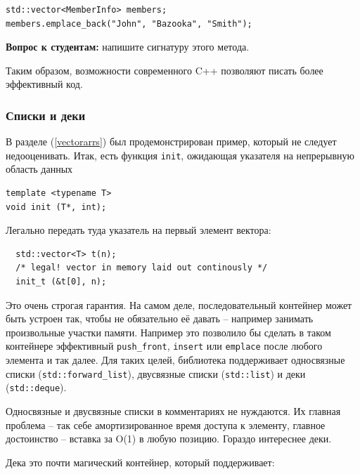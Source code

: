 \documentclass[a4paper,12pt,oneside]{article}
\newif\ifanswers
\begin{document}
\begin{lstlisting}
std::vector<MemberInfo> members;
members.emplace_back("John", "Bazooka", "Smith");
\end{lstlisting}

\textbf{Вопрос к студентам:} напишите сигнатуру этого метода.

\ifanswers
Правильный ответ: 
\begin{lstlisting}
template< class... Args >
void emplace_back( Args&&... args );
\end{lstlisting}
\fi

Таким образом, возможности современного C++ позволяют писать более эффективный код.

\subsubsection{Списки и деки}

В разделе (\ref{vectorarrs}) был продемонстрирован пример, который не следует недооценивать. Итак, есть функция \lstinline!init!, ожидающая указателя на непрерывную область данных

\begin{lstlisting}
template <typename T>
void init (T*, int);
\end{lstlisting}

Легально передать туда указатель на первый элемент вектора:

\begin{lstlisting}
  std::vector<T> t(n);
  /* legal! vector in memory laid out continously */
  init_t (&t[0], n);
\end{lstlisting}

Это очень строгая гарантия. На самом деле, последовательный контейнер может быть устроен так, чтобы не обязательно её давать -- например занимать произвольные участки памяти. Например это позволило бы сделать в таком контейнере эффективный \lstinline!push_front!, \lstinline!insert! или \lstinline!emplace! после любого элемента и так далее. Для таких целей, библиотека поддерживает односвязные списки (\lstinline!std::forward_list!), двусвязные списки (\lstinline!std::list!) и деки (\lstinline!std::deque!).

Односвязные и двусвязные списки в комментариях не нуждаются. Их главная проблема -- так себе амортизированное время доступа к элементу, главное достоинство -- вставка за O(1) в любую позицию. Гораздо интереснее деки.

Дека это почти магический контейнер, который поддерживает:
\end{document}
